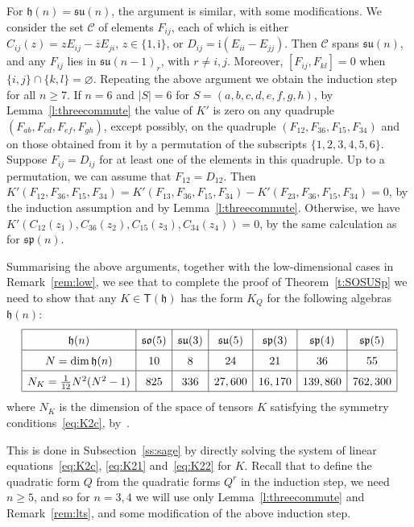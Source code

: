 \documentclass[12pt,reqno]{amsart}
\newcommand \cC{\mathcal{C}}
\newcommand \sT{\mathsf{T}}
\newcommand\h{\mathfrak h}
\newcommand \so{\mathfrak{so}}
\newcommand \spg{\mathfrak{sp}}
\newcommand \su{\mathfrak{su}}
\newcommand \ir{\mathrm{i}}
\newcommand \<{\langle}
\renewcommand \>{\rangle}
\theoremstyle{definition}
\theoremstyle{remark}
\begin{document}
	For $\h(n) = \su(n)$, the argument is similar, with some modifications. We consider the set $\cC$ of elements $F_{ij}$, each of which is either $C_{ij}(z) = z E_{ij} - \overline{z} E_{ji},\, z \in \{1,\ir\}$, or $D_{ij} = \ir (E_{ii}-E_{jj})$. Then $\cC$ spans $\su(n)$, and any $F_{ij}$ lies in $\su(n-1)_r$, with $r \ne i,j$. Moreover, $[F_{ij},F_{kl}] = 0$ when $\{i,j\} \cap \{k,l\} = \varnothing$. Repeating the above argument we obtain the induction step for all $n \ge 7$. If $n=6$ and $|S|=6$ for $S=(a,b,c,d,e,f,g,h)$, by Lemma~\ref{l:threecommute} the value of $K'$ is zero on any quadruple $(F_{ab},F_{cd},F_{ef},F_{gh})$, except possibly, on the quadruple $(F_{12},F_{36},F_{15},F_{34})$ and on those obtained from it by a permutation of the subscripts $\{1,2,3,4,5,6\}$. Suppose $F_{ij}=D_{ij}$ for at least one of the elements in this quadruple. Up to a permutation, we can assume that $F_{12}=D_{12}$. Then $K'(F_{12},F_{36},F_{15},F_{34}) = K'(F_{13},F_{36},F_{15},F_{34}) - K'(F_{23},F_{36},F_{15},F_{34}) = 0$, by the induction assumption and by Lemma~\ref{l:threecommute}. Otherwise, we have $K'(C_{12}(z_1),C_{36}(z_2),C_{15}(z_3),C_{34}(z_4)) = 0$, by the same calculation as for $\spg(n)$.
	
	\smallskip
	
	Summarising the above arguments, together with the low-dimensional cases in Remark~\ref{rem:low}, we see that to complete the proof of Theorem~\ref{t:SOSUSp} we need to show that any $K \in \sT(\h)$ has the form $K_Q$ for the following algebras $\h(n)$:
	\begin{equation} \label{eq:remain}
    {
    \renewcommand{\arraystretch}{1.5}
	\begin{array}{|c|c|c|c|c|c|c|}
    \hline
    \h(n) & \so(5) & \su(3) & \su(5) & \spg(3) & \spg(4) & \spg(5) \\
    \hline
    N=\dim \h(n) & 10 & 8 & 24 & 21 & 36 & 55 \\
    \hline
    N_K = \frac{1}{12}N^2 (N^2-1) & 825 & 336 & 27,600 & 16,170 & 139,860 & 762,300 \\
    \hline
    \end{array}
    }
	\end{equation}
where $N_K$ is the dimension of the space of tensors $K$ satisfying the symmetry conditions~\eqref{eq:K2c}, by~\cite[Remark~3]{MN2}.

	This is done in Subsection~\ref{ss:sage} by directly solving the system of linear equations~\eqref{eq:K2c}, \eqref{eq:K21} and~\eqref{eq:K22} for $K$. Recall that to define the quadratic form $Q$ from the quadratic forms $Q^r$ in the induction step, we need $n \ge 5$, and so for $n=3,4$ we will use only Lemma~\ref{l:threecommute} and Remark~\ref{rem:lts}, and some modification of the above induction step.
	
\end{document}
